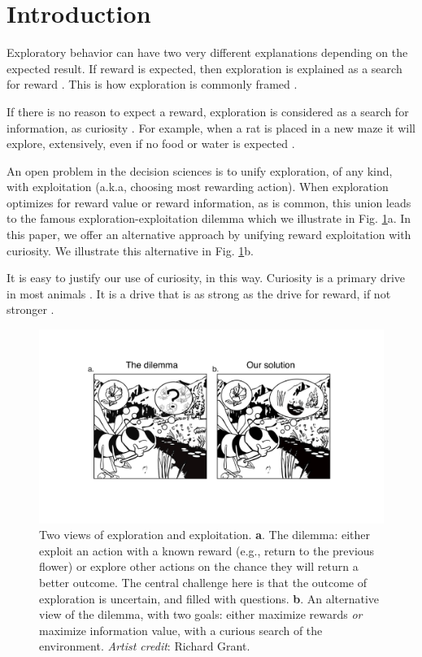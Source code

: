 \section*{Introduction}
Exploratory behavior can have two very different explanations depending on the expected result. If reward is expected, then exploration is explained as a search for reward \cite{Gupta2006,Sutton2018,Woodgate2017,Lee2011a,Schulz2018a,Calhoun2014}. This is how exploration is commonly framed \cite{Sutton2018}. 

If there is no reason to expect a reward, exploration is considered as a search for information, as curiosity \cite{Berlyne1950,Schmidhuber1991,Kidd2015,Jaegle2019,Sumner2019,Wang2019,Auersperg2015}. For example, when a rat is placed in a new maze it will explore, extensively, even if no food or water is expected \cite{Rosenberg2021}.

An open problem in the decision sciences is to unify exploration, of any kind, with exploitation (a.k.a, choosing most rewarding action). When exploration optimizes for reward value or reward information, as is common, this union leads to the famous exploration-exploitation dilemma \cite{Kelly1956,Berger-Tal2014,Dayan1996,Thrun1992,Mehlhorn2015,Kobayashi2019} which we illustrate in Fig. \ref{fig:bee}a. In this paper, we offer an alternative approach by unifying reward exploitation with curiosity. We illustrate this alternative in Fig. \ref{fig:bee}b.  

It is easy to justify our use of curiosity, in this way. Curiosity is a primary drive in most animals \cite{Berlyne1950,Loewenstein1994,Inglis2001}. It is a drive that is as strong as the drive for reward, if not stronger \cite{Loewenstein1994,Kidd2015,Gottlieb2018,Sumner2019,Gopnik2020,Song2019,Wang2019}. 

\begin{figure}
	\includegraphics[width=.9\linewidth]{img/bee.pdf} 
	\caption{Two views of exploration and exploitation. \textbf{a}. The dilemma: either exploit an action with a known reward (e.g., return to the previous flower) or explore other actions on the chance they will return a better outcome. The central challenge here is that the outcome of exploration is uncertain, and filled with questions. \textbf{b}. An alternative view of the dilemma, with two goals: either maximize rewards \textit{or} maximize information value, with a curious search of the environment. \textit{Artist credit}: Richard Grant.}
	\label{fig:bee} 
\end{figure}


